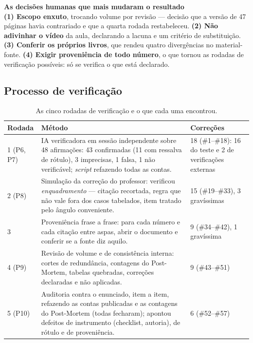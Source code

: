 \documentclass[11pt,a4paper]{article}
\newcommand{\destaque}[2]{%
  \begin{center}\begin{minipage}{0.96\textwidth}
  \colorbox{fundo}{\begin{minipage}{\dimexpr\linewidth-2\fboxsep}
  \vspace{2pt}\textbf{\color{azul}\small #1}\\[1pt]\footnotesize #2\vspace{3pt}
  \end{minipage}}\end{minipage}\end{center}}
\begin{document}
\destaque{As decisões humanas que mais mudaram o resultado}{%
\textbf{(1) Escopo enxuto}, trocando volume por revisão --- decisão que a versão de 47 páginas havia
contrariado e que a quarta rodada restabeleceu. \textbf{(2) Não adivinhar o vídeo} da aula, declarando a
lacuna e um critério de substituição. \textbf{(3) Conferir os próprios livros}, que rendeu quatro
divergências no material-fonte. \textbf{(4) Exigir proveniência de todo número}, o que tornou as rodadas de
verificação possíveis: só se verifica o que está declarado.}

\subsection{Processo de verificação}
\label{sec:adversarial}

\begin{table}[H]
\centering
\caption{As cinco rodadas de verificação e o que cada uma encontrou.}
\label{tab:rodadas}
{\footnotesize
\begin{tabular}{@{}L{2.2cm}L{9.4cm}L{3.0cm}@{}}
\toprule
\textbf{Rodada} & \textbf{Método} & \textbf{Correções} \\
 (P6, P7) & IA verificadora em sessão independente sobre 48 afirmações: 43 confirmadas (11 com ressalva de rótulo), 3 imprecisas, 1 falsa, 1 não verificável; \textit{script} refazendo todas as contas. & 18 (\#1--\#18): 16 do teste e 2 de verificações externas \\
2 (P8) & Simulação da correção do professor: verificou \emph{enquadramento} --- citação recortada, regra que não vale fora dos casos tabelados, item tratado pelo ângulo conveniente. & 15 (\#19--\#33), 3 gravíssimas \\
3 & Proveniência frase a frase: para cada número e cada citação entre aspas, abrir o documento e conferir se a fonte diz aquilo. & 9 (\#34--\#42), 1 gravíssima \\
4 (P9) & Revisão de volume e de consistência interna: cortes de redundância, contagens do Post-Mortem, tabelas quebradas, correções declaradas e não aplicadas. & 9 (\#43--\#51) \\
5 (P10) & Auditoria contra o enunciado, item a item, refazendo as contas publicadas e as contagens do Post-Mortem (todas fecharam); apontou defeitos de instrumento (checklist, autoria), de rótulo e de proveniência. & 6 (\#52--\#57) \\
\bottomrule
\end{tabular}}
\end{table}
\end{document}
